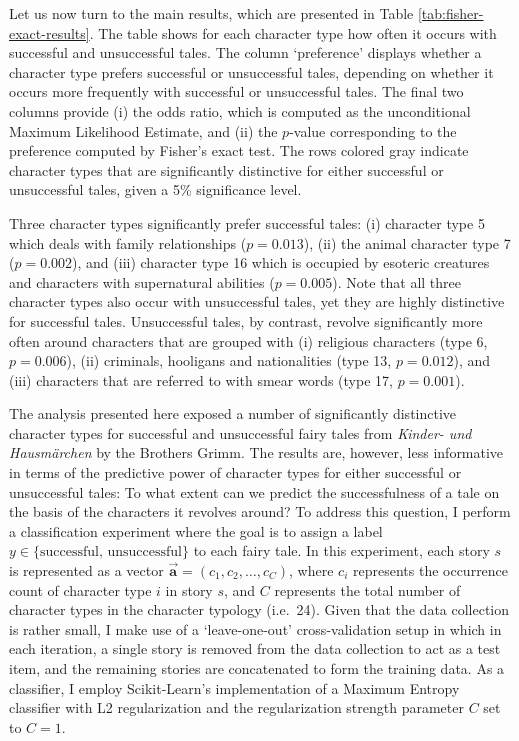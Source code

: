Let us now turn to the main results, which are presented in Table \ref{tab:fisher-exact-results}. The table shows for each character type how often it occurs with successful and unsuccessful tales. The column `preference' displays whether a character type prefers successful or unsuccessful tales, depending on whether it occurs more frequently with successful or unsuccessful tales. The final two columns provide (i) the odds ratio, which is computed as the unconditional Maximum Likelihood Estimate, and (ii) the $p$-value corresponding to the preference computed by Fisher's exact test. The rows colored gray indicate character types that are significantly distinctive for either successful or unsuccessful tales, given a 5\% significance level.

Three character types significantly prefer successful tales: (i) character type 5 which deals with family relationships ($p=0.013$), (ii) the animal character type 7 ($p=0.002$), and (iii) character type 16 which is occupied by esoteric creatures and characters with supernatural abilities ($p=0.005$). Note that all three character types also occur with unsuccessful tales, yet they are highly distinctive for successful tales. Unsuccessful tales, by contrast, revolve significantly more often around characters that are grouped with (i) religious characters (type 6, $p=0.006$), (ii) criminals, hooligans and nationalities (type 13, $p=0.012$), and (iii) characters that are referred to with smear words (type 17, $p=0.001$).

The analysis presented here exposed a number of significantly distinctive character types for successful and unsuccessful fairy tales from \emph{Kinder- und Hausmärchen} by the Brothers Grimm. The results are, however, less informative in terms of the predictive power of character types for either successful or unsuccessful tales: To what extent can we predict the successfulness of a tale on the basis of the characters it revolves around? To address this question, I perform a classification experiment where the goal is to assign a label $y \in \{\text{successful, unsuccessful}\}$ to each fairy tale. In this experiment, each story $s$ is represented as a vector $\vec{\mathbf{a}} = (c_1, c_2, \ldots, c_C)$, where $c_i$ represents the occurrence count of character type $i$ in story $s$, and $C$ represents the total number of character types in the character typology (i.e.\ 24). Given that the data collection is rather small, I make use of a `leave-one-out' cross-validation setup in which in each iteration, a single story is removed from the data collection to act as a test item, and the remaining stories are concatenated to form the training data. As a classifier, I employ Scikit-Learn's implementation of a Maximum Entropy classifier with L2 regularization and the regularization strength parameter $C$ set to $C=1$\autocite{sklearn:2011}. 


